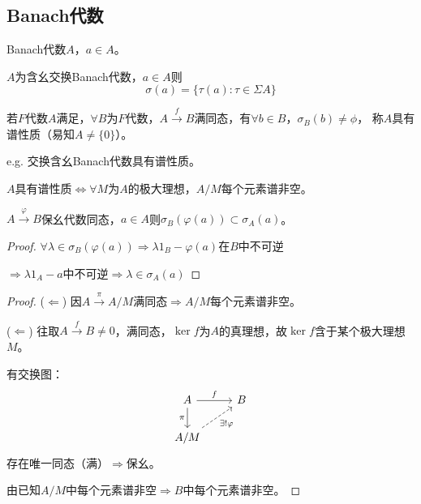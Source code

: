 \documentclass[lang=cn,a4paper,newtx,section]{elegantbook}
\begin{document}
\subsection{Banach代数}

Banach代数$A$，$a \in A$。

\begin{theorem}
  $A$为含幺交换Banach代数，$a \in A$则
  \begin{equation*}
    \sigma(a) = \{\tau(a) : \tau \in \Sigma A\}
  \end{equation*}
\end{theorem}

\begin{definition}[谱性质]
  若$F$代数$A$满足，$\forall B$为$F$代数，$A \xrightarrow{f} B$满同态，有$\forall b \in B$，$\sigma_B(b) \neq \phi$，
  称$A$具有谱性质（易知$A \neq \{0\}$）。
  
  e.g. 交换含幺Banach代数具有谱性质。
\end{definition}

\begin{proposition}
  $A$具有谱性质$\Longleftrightarrow \forall M$为$A$的极大理想，$A/M$每个元素谱非空。
\end{proposition}

\begin{proposition}
  $A \xrightarrow{\varphi} B$保幺代数同态，$a \in A$则$\sigma_B(\varphi(a)) \subset \sigma_A(a)$。
\end{proposition}

\begin{proof}
  $\forall \lambda \in \sigma_B(\varphi(a)) \Rightarrow \lambda 1_B - \varphi(a)$在$B$中不可逆
  
  $\Rightarrow \lambda 1_A - a$中不可逆$\Rightarrow \lambda \in \sigma_A(a)$
\end{proof}

\begin{proof}
  ($\Leftarrow$) 因$A \xrightarrow{\pi} A/M$满同态$\Rightarrow A/M$每个元素谱非空。
  
  ($\Leftarrow$) 往取$A \xrightarrow{f} B \neq 0$，满同态，$\ker f$为$A$的真理想，故$\ker f$含于某个极大理想$M$。
  
  有交换图：
  \begin{equation*}
    \begin{tikzcd}
      A \arrow[r, "f"] \arrow[d, "\pi"'] & B \\
      A/M \arrow[ur, "\exists! \varphi"', dashed] &
    \end{tikzcd}
  \end{equation*}
  存在唯一同态（满）$\Rightarrow$保幺。
  
  由已知$A/M$中每个元素谱非空$\Rightarrow B$中每个元素谱非空。
\end{proof}
\end{document}
